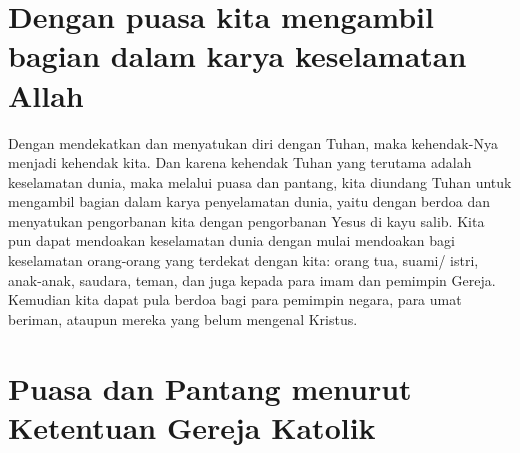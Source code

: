 \section*{Dengan puasa kita mengambil bagian dalam karya keselamatan Allah}

Dengan mendekatkan dan menyatukan diri dengan Tuhan, maka kehendak-Nya menjadi kehendak kita. Dan karena kehendak Tuhan yang terutama adalah keselamatan dunia, maka melalui puasa dan pantang, kita diundang Tuhan untuk mengambil bagian dalam karya penyelamatan dunia, yaitu dengan berdoa dan menyatukan pengorbanan kita dengan pengorbanan Yesus di kayu salib. Kita pun dapat mendoakan keselamatan dunia dengan mulai mendoakan bagi keselamatan orang-orang yang terdekat dengan kita: orang tua, suami/ istri, anak-anak, saudara, teman, dan juga kepada para imam dan pemimpin Gereja. Kemudian kita dapat pula berdoa bagi para pemimpin negara, para umat beriman, ataupun mereka yang belum mengenal Kristus.

\section*{Puasa dan Pantang menurut Ketentuan Gereja Katolik}

